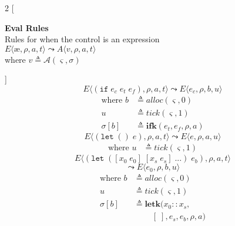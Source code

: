 \documentclass[12pt,draft]{article}
\newcommand\mae{\ensuremath{\text{\ae}}}
\newcommand{\ifsyn}[3]{(\texttt{if}\;#1\;#2\;#3)}
\begin{document}
\begin{multicols*}{2}
[
\begin{center}
\textbf{Eval Rules} \\
Rules for when the control is an expression \\
\vspace{5mm}
$E\langle \mae , \rho , a , t \rangle
\leadsto
A\langle v , \rho , a , t \rangle$ \\
where $v \triangleq \mathcal{A}(\varsigma, \sigma)$ \\
\vspace{-10mm}
\end{center}
]
\[
E\langle
\ifsyn{e_c}{e_t}{e_f} , \rho , a , t
\rangle
\leadsto
E\langle
e_c , \rho , b , u
\rangle
\]
\vspace{-13mm}
\begin{align*}
\text{where } b &\triangleq alloc(\varsigma, 0) \\
u &\triangleq tick(\varsigma, 1) \\
\sigma[b] &\triangleq \textbf{ifk}(e_t, e_f, \rho, a)
\end{align*}
\vspace{-5mm}
\[
E\langle
(\texttt{let}\;()\;e) , \rho , a , t
\rangle
\leadsto
E\langle
e , \rho , a , u
\rangle
\]
\vspace{-12mm}
\begin{align*}
\text{where } u &\triangleq tick(\varsigma, 1)
\end{align*}
\vspace{-5mm}
\[
E\langle
(\texttt{let}\;([x_0\;e_0]\;[x_s\;e_s]\;...)\;e_b) , \rho , a , t
\rangle
\]
\vspace{-7mm}
\[
\leadsto
E\langle
e_0 , \rho , b , u
\rangle
\]
\vspace{-11mm}
\begin{align*}
\text{where } b &\triangleq alloc(\varsigma, 0) \\
u &\triangleq tick(\varsigma, 1) \\
\sigma[b] &\triangleq \textbf{letk}(x_0::x_s, \\
&\;\;\;\;\;\;\;\; [\;], e_s, e_b, \rho, a)
\end{align*}
\vspace{-5mm}

\end{multicols*}
\end{document}
